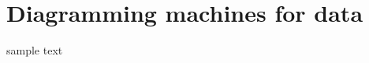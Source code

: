 \documentclass[book.tex]{subfiles}
\begin{document}
\chapter{Diagramming machines for data}
sample text
\end{document}
